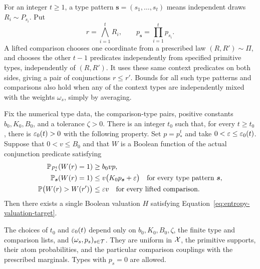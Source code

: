 For an integer $t\ge1$, a type pattern
$\boldsymbol s=(s_1,\ldots,s_t)$ means independent draws
$R_i\sim P_{s_i}$.  Put
\[
 r=\bigwedge_{i=1}^t R_i,
 \qquad p_{\boldsymbol s}=\prod_{i=1}^t p_{s_i}.
\]
A lifted comparison chooses one coordinate from a prescribed law
$(R,R')\sim\Pi$, and chooses the other $t-1$ predicates independently
from specified primitive types, independently of $(R,R')$.  It uses these
same context predicates on both sides, giving a pair of conjunctions
$r\le r'$.  Bounds for all such type patterns and comparisons also hold
when any of the context types are independently mixed with the weights
$\omega_s$, simply by averaging.

\begin{lemma}
\label{lem:rare-event}
Fix the numerical type data, the comparison-type pairs, positive constants
$b_0,K_0,B_0$, and a tolerance $\zeta>0$.  There is an integer $t_0$ such
that, for every $t\ge t_0$, there is $\varepsilon_0(t)>0$ with the following
property.  Set $p=p_*^t$ and take $0<\varepsilon\le\varepsilon_0(t)$.  Suppose that
$0<v\le B_0$ and that $W$ is a Boolean function of the actual conjunction
predicate satisfying
\begin{align}
 \mathbb P_{P_*^t}(W(r)=1)&\ge b_0vp,
 \label{eq:entropy-iid-success}\\
 \mathbb P_{\boldsymbol s}(W(r)=1)
 &\le v\bigl(K_0p_{\boldsymbol s}+\varepsilon\bigr)
 \quad\text{for every type pattern }\boldsymbol s,
 \label{eq:entropy-pattern-upper}\\
 \mathbb P\bigl(W(r)>W(r')\bigr)&\le\varepsilon v
 \quad\text{for every lifted comparison.}
 \label{eq:entropy-lifted-order}
\end{align}
Then there exists a single Boolean valuation $H$ satisfying
Equation~\ref{eq:entropy-valuation-target}.

The choices of $t_0$ and $\varepsilon_0(t)$ depend only on
$b_0,K_0,B_0,\zeta$, the finite type and comparison lists, and
$(\omega_s,p_s)_{s\in\mathcal T}$.  They are uniform in $\mathcal X$, the primitive
supports, their atom probabilities, and the particular comparison
couplings with the prescribed marginals.  Types with $p_s=0$ are allowed.
\end{lemma}

